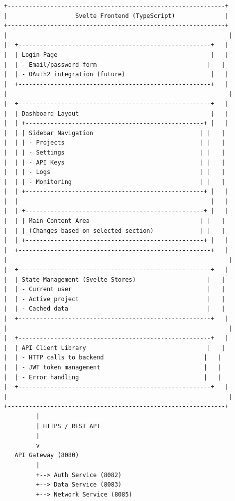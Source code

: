 \documentclass[11pt,a4paper]{report}
\begin{document}
\begin{lstlisting}[language=text]
+-------------------------------------------------------------+
|                   Svelte Frontend (TypeScript)              |
+-------------------------------------------------------------+
|                                                              |
|  +------------------------------------------------------+   |
|  | Login Page                                           |   |
|  | - Email/password form                               |   |
|  | - OAuth2 integration (future)                        |   |
|  +------------------------------------------------------+   |
|                                                              |
|  +------------------------------------------------------+   |
|  | Dashboard Layout                                     |   |
|  | +--------------------------------------------------+ |   |
|  | | Sidebar Navigation                              | |   |
|  | | - Projects                                      | |   |
|  | | - Settings                                      | |   |
|  | | - API Keys                                      | |   |
|  | | - Logs                                          | |   |
|  | | - Monitoring                                    | |   |
|  | +--------------------------------------------------+ |   |
|  |                                                      |   |
|  | +--------------------------------------------------+ |   |
|  | | Main Content Area                               | |   |
|  | | (Changes based on selected section)             | |   |
|  | +--------------------------------------------------+ |   |
|  +------------------------------------------------------+   |
|                                                              |
|  +------------------------------------------------------+   |
|  | State Management (Svelte Stores)                    |   |
|  | - Current user                                      |   |
|  | - Active project                                    |   |
|  | - Cached data                                       |   |
|  +------------------------------------------------------+   |
|                                                              |
|  +------------------------------------------------------+   |
|  | API Client Library                                  |   |
|  | - HTTP calls to backend                            |   |
|  | - JWT token management                             |   |
|  | - Error handling                                   |   |
|  +------------------------------------------------------+   |
|                                                              |
+-------------------------------------------------------------+
         |
         | HTTPS / REST API
         |
         v
   API Gateway (8080)
         |
         +--> Auth Service (8082)
         +--> Data Service (8083)
         +--> Network Service (8085)
\end{lstlisting}
\end{document}
